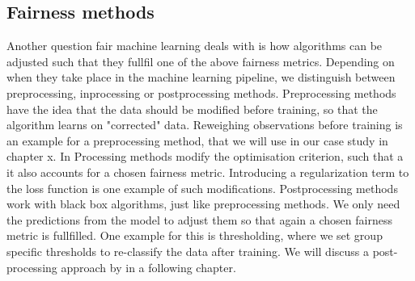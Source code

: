 \subsection*{Fairness methods}
Another question fair machine learning deals with is how algorithms can be adjusted such that they fullfil one of the above fairness metrics.
Depending on when they take place in the machine learning pipeline, we distinguish between preprocessing, inprocessing or postprocessing methods.
Preprocessing methods have the idea that the data should be modified before training, so that the algorithm learns on "corrected" data. Reweighing observations before training is an example for a preprocessing method, that we will use in our case study in chapter x.
In Processing methods modify the optimisation criterion, such that a it also accounts for a chosen fairness metric. Introducing a regularization term to the loss function is one example of such modifications.
Postprocessing methods work with black box algorithms, just like preprocessing methods. We only need the predictions from the model to adjust them so that again a chosen fairness metric is fullfilled. One example for this is thresholding, where we set group specific thresholds to re-classify the data after training. We will discuss a post-processing approach by \cite{hardt2016} in a following chapter.




